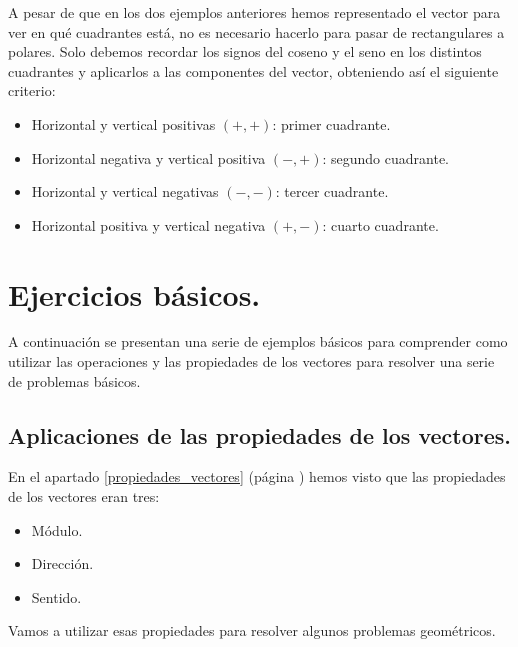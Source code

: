 \documentclass[a4paper,11pt,answers]{exam}
\begin{document}
A pesar de que en los dos ejemplos anteriores hemos representado el vector para ver en qué
cuadrantes está, no es necesario hacerlo para pasar de rectangulares a polares. Solo debemos
recordar los signos del coseno y el seno en los distintos cuadrantes y aplicarlos a las componentes
del vector, obteniendo así el siguiente criterio:
\begin{itemize}
\item Horizontal y vertical positivas $(+,+)$: primer cuadrante.
\item Horizontal negativa y vertical positiva $(-,+)$: segundo cuadrante.
\item Horizontal y vertical negativas $(-,-)$: tercer cuadrante.
\item Horizontal positiva y vertical negativa $(+,-)$: cuarto cuadrante.
\end{itemize}

\section{Ejercicios básicos.}
A continuación se presentan una serie de ejemplos básicos para comprender como utilizar las
operaciones y las propiedades de los vectores para resolver una serie de problemas básicos.

\subsection{Aplicaciones de las propiedades de los vectores.}
En el apartado \ref{propiedades_vectores} (página \pageref{propiedades_vectores}) hemos visto que
las propiedades de los vectores eran tres:
\begin{itemize}
\item Módulo.
\item Dirección.
\item Sentido.
\end{itemize}
Vamos a utilizar esas propiedades para resolver algunos problemas geométricos.\\
\end{document}
